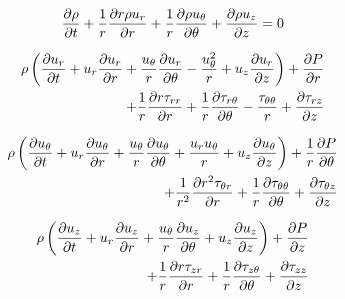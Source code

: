 \documentclass{article}
\begin{document}
\begin{equation}
     {{\partial \rho } \over {\partial t}}
   + \frac{1}{r}{{\partial r \rho u_r} \over {\partial r}} 
   + \frac{1}{r}{{\partial \rho u_\theta } \over {\partial \theta}} 
   + {{\partial \rho u_z } \over {\partial z}}
   = 0
\end{equation}

\begin{eqnarray}
     \rho\left( {{\partial u_r} \over {\partial t}}
   + u_r {{\partial u_r} \over {\partial r}} 
   + \frac{u_\theta}{r} \frac{\partial u_r}{\partial \theta} -\frac{u_\theta^2}{r}
   + u_z\frac{\partial u_r}{\partial z} \right)
   + {{\partial P} \over {\partial r}} \\ \nonumber
   + \frac{1}{r}\frac{\partial r \tau_{rr}}{\partial r}
   + \frac{1}{r} \frac{\partial \tau_{r \theta}}{\partial \theta} - \frac{\tau_{\theta \theta}}{r}
   + \frac{\partial \tau_{rz}}{\partial z}
\end{eqnarray}

\begin{eqnarray}
     \rho\left( {{\partial u_\theta} \over {\partial t}}
   + u_r {{\partial u_\theta} \over {\partial r}} 
   + \frac{u_\theta}{r} \frac{\partial u_\theta}{\partial \theta} + \frac{u_r u_\theta}{r}
   + u_z\frac{\partial u_\theta}{\partial z}   \right)
   + \frac{1}{r}{{\partial P} \over {\partial \theta}} \\ \nonumber
   + \frac{1}{r^2}\frac{\partial r^2 \tau_{\theta r}}{\partial r}
   + \frac{1}{r} \frac{\partial \tau_{\theta \theta}}{\partial \theta} 
   + \frac{\partial \tau_{\theta z}}{\partial z}
\end{eqnarray}

\begin{eqnarray}
     \rho\left( {{\partial u_z} \over {\partial t}}
   + u_r {{\partial u_z} \over {\partial r}} + \frac{u_\theta}{r} \frac{\partial u_z}{\partial \theta} 
   + u_z\frac{\partial u_z}{\partial z} \right)
   + {{\partial P} \over {\partial z}} \\ \nonumber
   + \frac{1}{r}\frac{\partial r \tau_{zr}}{\partial r}
   + \frac{1}{r} \frac{\partial \tau_{z \theta}}{\partial \theta}
   + \frac{\partial \tau_{zz}}{\partial z}
\end{eqnarray}
\end{document}
